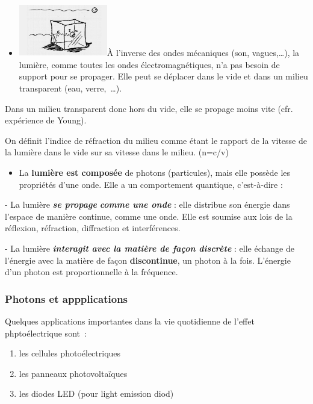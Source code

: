 {\begin{itemize}
\item
  \includegraphics[width=3.861cm,height=2.281cm]{Pictures/10000001000001D40000010F4347AFBBBD12FC87.png}À
  l'inverse des ondes mécaniques (son, vagues,\ldots), la lumière, comme
  toutes les ondes électromagnétiques, n'a pas besoin de support pour se
  propager. Elle peut se déplacer dans le vide et dans un milieu
  transparent (eau, verre,~\ldots).
\end{itemize}

Dans un milieu transparent donc hors du vide, elle se propage moins vite
(cfr. expérience de Young).

On définit l'indice de réfraction du milieu comme étant le rapport de la
vitesse de la lumière dans le vide sur sa vitesse dans le milieu.
(n=c/v)

\begin{itemize}

\item
  La \textbf{lumière est composée} de photons (particules), mais elle
  possède les propriétés d'une onde. Elle a un comportement quantique,
  c'est-à-dire :
\end{itemize}

- La lumière \emph{\textbf{se propage}} \emph{\textbf{comme une onde }}:
elle distribue son énergie dans l'espace de manière continue, comme une
onde. Elle est soumise aux lois de la réflexion, réfraction, diffraction
et interférences.

- La lumière \emph{\textbf{interagit avec la matière de façon discrète}}
: elle échange de l'énergie avec la matière de façon
\textbf{discontinue}, un photon à la fois. L'énergie d'un photon est
proportionnelle à la fréquence.

\subsubsection{Photons et appplications}
Quelques applications importantes dans la vie quotidienne de l'effet phptoélectrique sont~:
\begin{enumerate}
\item  les cellules photoélectriques
\item  les panneaux photovoltaïques
\item  les diodes LED (pour light emission diod)
\end{enumerate}

}
